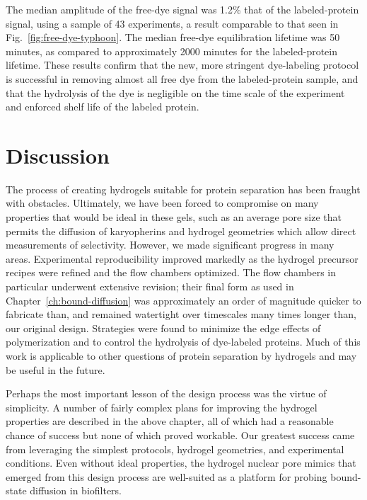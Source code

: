The median amplitude of the free-dye signal was 1.2\% that of the labeled-protein signal, using a sample of 43 experiments, a result comparable to that seen in Fig.~\ref{fig:free-dye-typhoon}.  The median free-dye equilibration lifetime was 50 minutes, as compared to approximately 2000 minutes for the labeled-protein lifetime.  These results confirm that the new, more stringent dye-labeling protocol is successful in removing almost all free dye from the labeled-protein sample, and that the hydrolysis of the dye is negligible on the time scale of the experiment and enforced shelf life of the labeled protein.

\section{Discussion}

The process of creating hydrogels suitable for protein separation has been fraught with obstacles.  Ultimately, we have been forced to compromise on many properties that would be ideal in these gels, such as an average pore size that permits the diffusion of karyopherins and hydrogel geometries which allow direct measurements of selectivity.  However, we made significant progress in many areas.  Experimental reproducibility improved markedly as the hydrogel precursor recipes were refined and the flow chambers optimized.  The flow chambers in particular underwent extensive revision; their final form as used in Chapter~\ref{ch:bound-diffusion} was approximately an order of magnitude quicker to fabricate than, and remained watertight over timescales many times longer than, our original design.  Strategies were found to minimize the edge effects of polymerization and to control the hydrolysis of dye-labeled proteins.  Much of this work is applicable to other questions of protein separation by hydrogels and may be useful in the future.

Perhaps the most important lesson of the design process was the virtue of simplicity.  A number of fairly complex plans for improving the hydrogel properties are described in the above chapter, all of which had a reasonable chance of success but none of which proved workable.  Our greatest success came from leveraging the simplest protocols, hydrogel geometries, and experimental conditions.  Even without ideal properties, the hydrogel nuclear pore mimics that emerged from this design process are well-suited as a platform for probing bound-state diffusion in biofilters.


